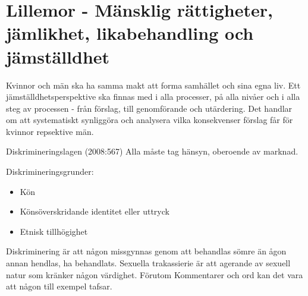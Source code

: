 \chapter{Lillemor - Mänsklig rättigheter, jämlikhet, likabehandling och jämställdhet}
Kvinnor och män ska ha samma makt att forma samhället och sina egna liv.
Ett jämställdhetsperspektive ska finnas med i alla processer, på alla nivåer och i alla steg av processen - från förslag, till genomförande och utärdering. Det handlar om att systematiskt synliggöra och analysera vilka konsekvenser förslag får för kvinnor repsektive män.

Diskrimineringslagen (2008:567)
Alla måste tag hänsyn, oberoende av marknad.

Diskrimineringsgrunder:
\begin{itemize}
	\item  Kön
	\item  Könsöverskridande identitet eller uttryck
	\item  Etnisk tillhögighet
\end{itemize}

Diskriminering är att någon missgynnas genom att behandlas sömre än ågon annan hendlas, ha behandlats.
Sexuella trakassierie är att agerande av sexuell natur som kränker någon värdighet. Förutom Kommentarer och ord kan det vara att någon till exempel tafsar.

